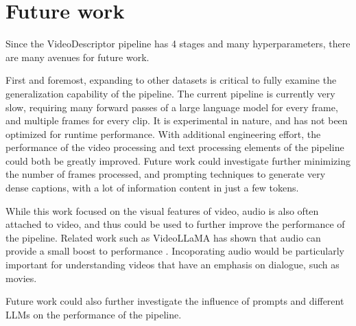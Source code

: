 \section{Future work}

Since the VideoDescriptor pipeline has 4 stages and many hyperparameters, there are many avenues for future work.

First and foremost, expanding to other datasets is critical to fully examine the generalization capability of the pipeline.
The current pipeline is currently very slow, requiring many forward passes of a large language model for every frame, and multiple frames for every clip.
It is experimental in nature, and has not been optimized for runtime performance.
With additional engineering effort, the performance of the video processing and text processing elements of the pipeline could both be greatly improved.
Future work could investigate further minimizing the number of frames processed, and prompting techniques to generate very dense captions, with a lot of information content in just a few tokens.

While this work focused on the visual features of video, audio is also often attached to video, and thus could be used to further improve the performance of the pipeline.
Related work such as VideoLLaMA has shown that audio can provide a small boost to performance \cite{videollama}.
Incoporating audio would be particularly important for understanding videos that have an emphasis on dialogue, such as movies.

Future work could also further investigate the influence of prompts and different LLMs on the performance of the pipeline.
